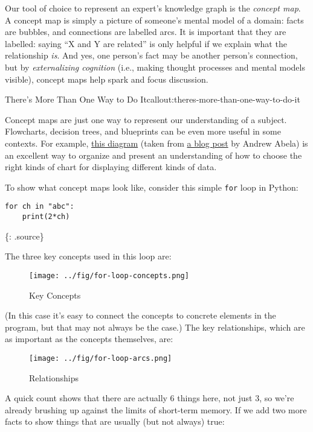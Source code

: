 Our tool of choice to represent an expert's knowledge graph is the
\emph{concept map}. A concept map is simply a picture of someone's
mental model of a domain: facts are bubbles, and connections are
labelled arcs. It is important that they are labelled: saying ``X and Y
are related'' is only helpful if we explain what the relationship
\emph{is}. And yes, one person's fact may be another person's
connection, but by \emph{externalizing cognition} (i.e., making thought
processes and mental models visible), concept maps help spark and focus
discussion.

\begin{callout}{There's More Than One Way to Do It}{callout:theres-more-than-one-way-to-do-it}

Concept maps are just one way to represent our understanding of a
subject. Flowcharts, decision trees, and blueprints can be even more
useful in some contexts. For example,
\href{fixme-abela}{this diagram}
(taken from \href{http://extremepresentation.typepad.com/blog/2006/09/choosing\_a\_good.html}{a blog post}
by Andrew Abela) is an excellent way to organize and present
an understanding of how to choose the right kinds of chart for
displaying different kinds of data.
\end{callout}

To show what concept maps look like, consider this simple \texttt{for}
loop in Python:

\begin{verbatim}
for ch in "abc":
    print(2*ch)
\end{verbatim}

\{: .source\}

The three key concepts used in this loop are:

\begin{figure}[htbp]
\centering
\texttt{[image: ../fig/for-loop-concepts.png]}
\caption{Key Concepts}
\end{figure}

(In this case it's easy to connect the concepts to concrete elements in
the program, but that may not always be the case.) The key
relationships, which are as important as the concepts themselves, are:

\begin{figure}[htbp]
\centering
\texttt{[image: ../fig/for-loop-arcs.png]}
\caption{Relationships}
\end{figure}

A quick count shows that there are actually 6 things here, not just 3,
so we're already brushing up against the limits of short-term memory. If
we add two more facts to show things that are usually (but not always)
true:

